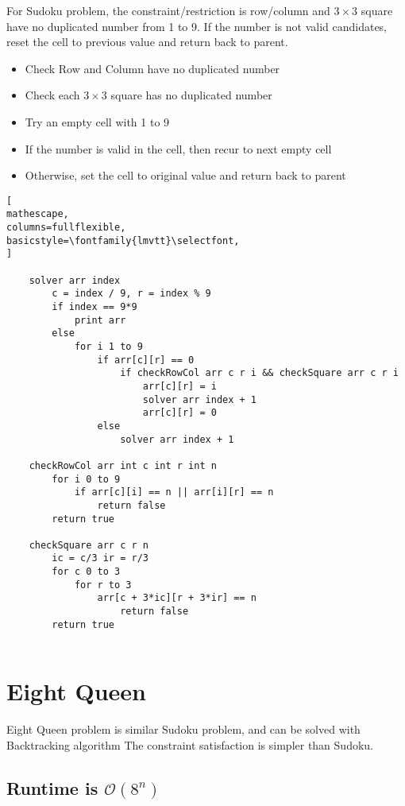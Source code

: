 \documentclass{article}
\begin{document}
For Sudoku problem, the constraint/restriction is row/column and $3\times3$ square have no duplicated number from 1 to 9.
If the number is not valid candidates, reset the cell to previous value and return back to parent. 
\begin{itemize}
\item[] Check Row and Column have no duplicated number 
\item[] Check each $3\times3$ square has no duplicated number 
\item[] Try an empty cell with 1 to 9 
\item[] If the number is valid in the cell, then recur to next empty cell
\item[] Otherwise, set the cell to original value and return back to parent
\end{itemize}

\begin{lstlisting}[
mathescape,
columns=fullflexible,
basicstyle=\fontfamily{lmvtt}\selectfont,
]

    solver arr index
        c = index / 9, r = index % 9
        if index == 9*9
            print arr
        else
            for i 1 to 9
                if arr[c][r] == 0     
                    if checkRowCol arr c r i && checkSquare arr c r i
                        arr[c][r] = i
                        solver arr index + 1
                        arr[c][r] = 0
                else
                    solver arr index + 1

    checkRowCol arr int c int r int n
        for i 0 to 9 
            if arr[c][i] == n || arr[i][r] == n
                return false
        return true

    checkSquare arr c r n
        ic = c/3 ir = r/3
        for c 0 to 3 
            for r to 3 
                arr[c + 3*ic][r + 3*ir] == n
                    return false
        return true
        
\end{lstlisting} 

\section{Eight Queen}
Eight Queen problem is similar Sudoku problem, and can be solved with Backtracking algorithm
The constraint satisfaction is simpler than Sudoku.
\subsection{Runtime is $\mathcal{O}(8^n)$}
\end{document}
